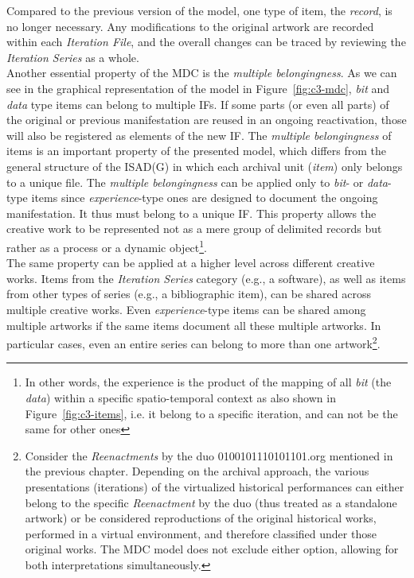 Compared to the previous version of the model, one type of item, the \textit{record}, is no longer necessary. Any modifications to the original artwork are recorded within each \textit{Iteration File}, and the overall changes can be traced by reviewing the \textit{Iteration Series} as a whole.\\
Another essential property of the MDC is the \textit{multiple belongingness}. As we can see in the graphical representation of the model in Figure~\ref{fig:c3-mdc}, \textit{bit} and \textit{data} type items can belong to multiple IFs. If some parts (or even all parts) of the original or previous manifestation are reused in an ongoing reactivation, those will also be registered as elements of the new IF. The \textit{multiple belongingness} of items is an important property of the presented model, which differs from the general structure of the ISAD(G) in which each archival unit (\textit{item}) only belongs to a unique file. The \textit{multiple belongingness} can be applied only to \textit{bit}- or \textit{data}-type items since \textit{experience}-type ones are designed to document the ongoing manifestation. It thus must belong to a unique IF. This property allows the creative work to be represented not as a mere group of delimited records but rather as a process or a dynamic object\footnote{In other words, the experience is the product of the mapping of all \textit{bit} (the \textit{data}) within a specific spatio-temporal context as also shown in Figure~\ref{fig:c3-items}, i.e. it belong to a specific iteration, and can not be the same for other ones}.\\
The same property can be applied at a higher level across different creative works. Items from the \textit{Iteration Series} category (e.g., a software), as well as items from other types of series (e.g., a bibliographic item), can be shared across multiple creative works. Even \textit{experience}-type items can be shared among multiple artworks if the same items document all these multiple artworks. In particular cases, even an entire series can belong to more than one artwork\footnote{Consider the \textit{Reenactments} by the duo 0100101110101101.org mentioned in the previous chapter. Depending on the archival approach, the various presentations (iterations) of the virtualized historical performances can either belong to the specific \textit{Reenactment} by the duo (thus treated as a standalone artwork) or be considered reproductions of the original historical works, performed in a virtual environment, and therefore classified under those original works. The MDC model does not exclude either option, allowing for both interpretations simultaneously.}.\\
